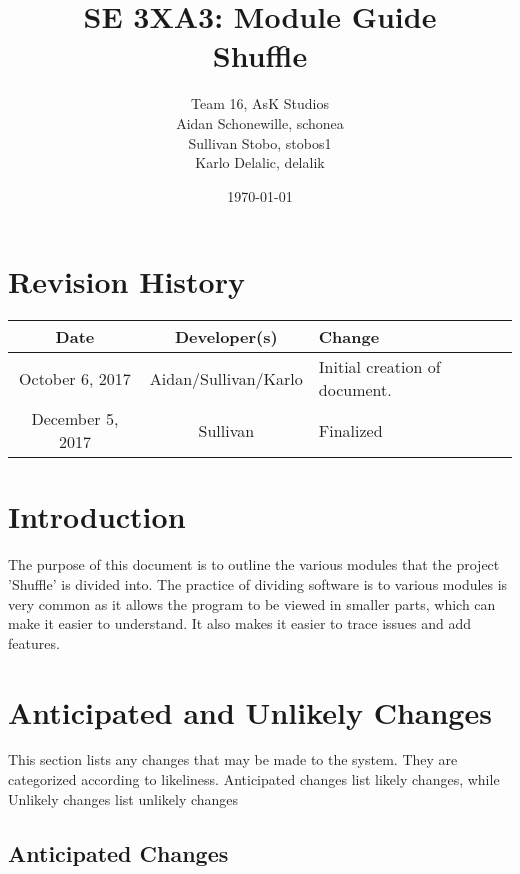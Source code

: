 \documentclass[12pt, titlepage]{article}
\title{SE 3XA3: \color{red}Module Guide\color{black}\\Shuffle}
\author{Team 16, AsK Studios
		\\ Aidan Schonewille, schonea
		\\ Sullivan Stobo, stobos1
		\\ Karlo Delalic, delalik
}
\date{\today}
\begin{document}
\section*{Revision History}
\begin{center}
\begin{tabular}{| c | c | p{6cm} |}
\hline
\textbf{Date} & \textbf{Developer(s)} & \textbf{Change}\\
\hline
October 6, 2017 & Aidan/Sullivan/Karlo & Initial creation of document.\\
\hline
December 5, 2017 & Sullivan & Finalized \\
\hline
\end{tabular}
\end{center}

\maketitle

\tableofcontents
\listoftables
\listoffigures

\newpage


\section{Introduction}

\color{red} The purpose of this document is to outline the various modules that the project 'Shuffle' is divided into.  The practice of dividing software is to various modules is very common as it allows the program to be viewed in smaller parts, which can make it easier to understand.  It also makes it easier to trace issues and add features. \color{black}

\section{Anticipated and Unlikely Changes} \label{SecChange}

\color{red}This section lists any changes that may be made to the system.  They are categorized according to likeliness.  Anticipated changes list likely changes, while Unlikely changes list unlikely changes\color{black}

\subsection{Anticipated Changes} \label{SecAchange}
\end{document}

